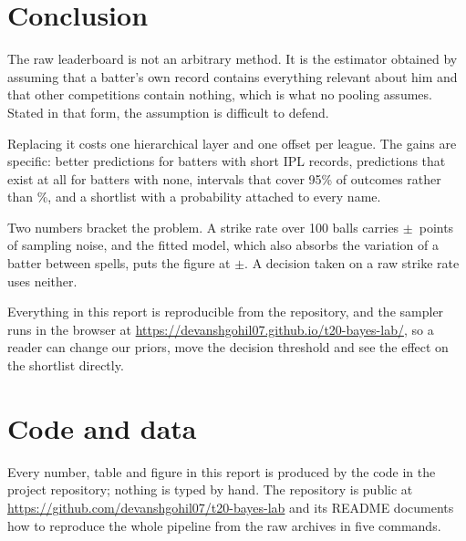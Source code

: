 \documentclass[11pt,a4paper]{article}
\begin{document}
\section{Conclusion}

The raw leaderboard is not an arbitrary method. It is the estimator obtained by assuming that
a batter's own record contains everything relevant about him and that other competitions contain
nothing, which is what no pooling assumes. Stated in that form, the assumption is difficult to
defend.

Replacing it costs one hierarchical layer and one offset per league. The gains are specific:
better predictions for batters with short IPL records, predictions that exist at all for batters
with none, intervals that cover 95\% of outcomes rather than \ncovMone\%, and a shortlist with
a probability attached to every name.

Two numbers bracket the problem. A strike rate over 100 balls carries $\pm$\nsdHundred\ points
of sampling noise, and the fitted model, which also absorbs the variation of a batter between
spells, puts the figure at $\pm$\nsdHundredFit. A decision taken on a raw strike rate uses
neither.

Everything in this report is reproducible from the repository, and the sampler runs in the
browser at \url{https://devanshgohil07.github.io/t20-bayes-lab/}, so a reader can change our
priors, move the decision threshold and see the effect on the shortlist directly.


\section*{Code and data}

Every number, table and figure in this report is produced by the code in the project
repository; nothing is typed by hand. The repository is public at
\url{https://github.com/devanshgohil07/t20-bayes-lab} and its README documents how to
reproduce the whole pipeline from the raw archives in five commands.
\end{document}
